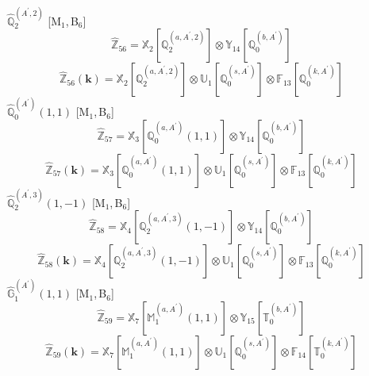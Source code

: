\documentclass[fleqn,10pt,landscape]{article}
\begin{document}
\begin{itemize}
\begin{dmath*}
\end{dmath*}
\vspace{4mm}
\noindent {} $\,\,\,\hat{\mathbb{Q}}_{2}^{(A^{\prime},2)}$ [M$_{1}$,\,B$_{6}$]
\begin{dmath*}
\hat{\mathbb{Z}}_{56}=\mathbb{X}_{2}[\mathbb{Q}_{2}^{(a,A^{\prime},2)}] \otimes\mathbb{Y}_{14}[\mathbb{Q}_{0}^{(b,A^{\prime})}]
\end{dmath*}
\begin{dmath*}
\hat{\mathbb{Z}}_{56}(\bm{k})=\mathbb{X}_{2}[\mathbb{Q}_{2}^{(a,A^{\prime},2)}] \otimes\mathbb{U}_{1}[\mathbb{Q}_{0}^{(s,A^{\prime})}] \otimes\mathbb{F}_{13}[\mathbb{Q}_{0}^{(k,A^{\prime})}]
\end{dmath*}
\vspace{4mm}
\noindent {} $\,\,\,\hat{\mathbb{Q}}_{0}^{(A^{\prime})}(1,1)$ [M$_{1}$,\,B$_{6}$]
\begin{dmath*}
\hat{\mathbb{Z}}_{57}=\mathbb{X}_{3}[\mathbb{Q}_{0}^{(a,A^{\prime})}(1,1)] \otimes\mathbb{Y}_{14}[\mathbb{Q}_{0}^{(b,A^{\prime})}]
\end{dmath*}
\begin{dmath*}
\hat{\mathbb{Z}}_{57}(\bm{k})=\mathbb{X}_{3}[\mathbb{Q}_{0}^{(a,A^{\prime})}(1,1)] \otimes\mathbb{U}_{1}[\mathbb{Q}_{0}^{(s,A^{\prime})}] \otimes\mathbb{F}_{13}[\mathbb{Q}_{0}^{(k,A^{\prime})}]
\end{dmath*}
\vspace{4mm}
\noindent {} $\,\,\,\hat{\mathbb{Q}}_{2}^{(A^{\prime},3)}(1,-1)$ [M$_{1}$,\,B$_{6}$]
\begin{dmath*}
\hat{\mathbb{Z}}_{58}=\mathbb{X}_{4}[\mathbb{Q}_{2}^{(a,A^{\prime},3)}(1,-1)] \otimes\mathbb{Y}_{14}[\mathbb{Q}_{0}^{(b,A^{\prime})}]
\end{dmath*}
\begin{dmath*}
\hat{\mathbb{Z}}_{58}(\bm{k})=\mathbb{X}_{4}[\mathbb{Q}_{2}^{(a,A^{\prime},3)}(1,-1)] \otimes\mathbb{U}_{1}[\mathbb{Q}_{0}^{(s,A^{\prime})}] \otimes\mathbb{F}_{13}[\mathbb{Q}_{0}^{(k,A^{\prime})}]
\end{dmath*}
\vspace{4mm}
\noindent {} $\,\,\,\hat{\mathbb{G}}_{1}^{(A^{\prime})}(1,1)$ [M$_{1}$,\,B$_{6}$]
\begin{dmath*}
\hat{\mathbb{Z}}_{59}=\mathbb{X}_{7}[\mathbb{M}_{1}^{(a,A^{\prime})}(1,1)] \otimes\mathbb{Y}_{15}[\mathbb{T}_{0}^{(b,A^{\prime})}]
\end{dmath*}
\begin{dmath*}
\hat{\mathbb{Z}}_{59}(\bm{k})=\mathbb{X}_{7}[\mathbb{M}_{1}^{(a,A^{\prime})}(1,1)] \otimes\mathbb{U}_{1}[\mathbb{Q}_{0}^{(s,A^{\prime})}] \otimes\mathbb{F}_{14}[\mathbb{T}_{0}^{(k,A^{\prime})}]

\end{dmath*}
\end{itemize}
\end{document}
